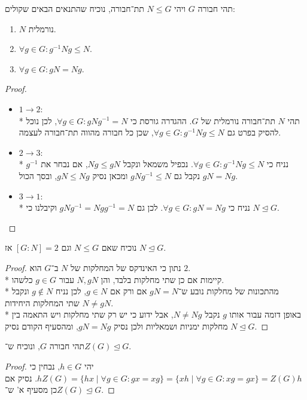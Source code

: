 \Question{}
\Subquestion{}
תהי חבורה $G$ ויהי $N \le G$ תת־חבורה, נוכיח שהתנאים הבאים שקולים:
\begin{enumerate}
	\item $N$ נורמלית.
	\item $\forall g \in G : g^{-1} N g \le N$.
	\item $\forall g \in G : gN = Ng$.
\end{enumerate}
\begin{proof}
	\begin{itemize}
		\item $1 \to 2$: \\*
			תהי $N$ תת־חבורה נורמלית של $G$.
			ההגדרה גורסת כי $\forall g \in G : gNg^{-1} = N$, לכן נוכל להסיק בפרט גם $\forall g \in G : g^{-1} N g \le N$, שכן כל חבורה מהווה תת־חבורה לעצמה.
		\item $2 \to 3$: \\*
			נניח כי $\forall g \in G : g^{-1} N g \le N$.
			נכפיל משמאל ונקבל $N g \le g N$, אם נבחר את $g^{-1}$ נקבל גם $g N g^{-1} \le N$ ומכאן נסיק $g N \le N g$, ובסך הכול $g N = Ng$.
		\item $3 \to 1$: \\*
			נניח כי $\forall g \in G : g N = N g$.
			לכן גם $g N g^{-1} = N g g^{-1} = N$ וקיבלנו כי $N \trianglelefteq G$.
	\end{itemize}
\end{proof}

\Subquestion{}
נוכיח שאם $N \le G$ וגם $[G : N] = 2$ אז $N \trianglelefteq G$.
\begin{proof}
	נתון כי האינדקס של המחלקות של $N$ ב־$G$ הוא $2$. \\*
	קיימות אם כן שתי מחלקות בלבד, והן $N, gN$ עבור $g \in G$ כלשהו. \\*
	מהתכונות של מחלקות נובע ש־$g N = N$ אם ורק אם $g \in N$, לכן נניח $g \notin N$ ונקבל $N \ne gN$ שתי המחלקות היחידות. \\*
	באופן דומה עבור אותו $g$ נקבל $N \ne N g$, אבל ידוע כי יש רק שתי מחלקות ויש התאמה בין מחלקות ימניות ושמאליות ולכן נסיק $g N = N g$, ומהסעיף הקודם נסיק $N \trianglelefteq G$.
\end{proof}

\Subquestion{}
תהי חבורה $G$, ונוכיח ש־$Z(G) \trianglelefteq G$.
\begin{proof}
	יהי $h \in G$, נבחין כי $h Z(G) = \{ hx \mid \forall g \in G : gx = xg\} = \{ xh \mid \forall g \in G: xg = gx \} = Z(G) h$.
	נסיק אם כן מסעיף א' ש־$Z(G) \trianglelefteq G$.
\end{proof}

